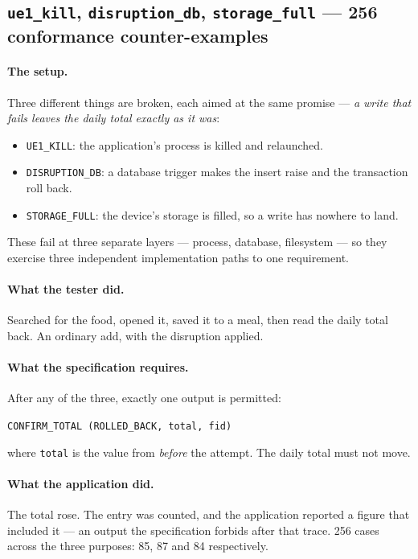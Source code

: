 \documentclass[11pt,a4paper]{article}
\newcommand{\gate}[1]{\texttt{\small #1}}
\begin{document}
\subsection{\gate{ue1\_kill}, \gate{disruption\_db}, \gate{storage\_full} --- 256 conformance counter-examples}
\label{sec:writepath}

\paragraph{The setup.}
Three different things are broken, each aimed at the same promise --- \emph{a
write that fails leaves the daily total exactly as it was}:

\begin{itemize}\setlength\itemsep{1pt}
  \item \gate{UE1\_KILL}: the application's process is killed and relaunched.
  \item \gate{DISRUPTION\_DB}: a database trigger makes the insert raise and the
        transaction roll back.
  \item \gate{STORAGE\_FULL}: the device's storage is filled, so a write has
        nowhere to land.
\end{itemize}

\noindent These fail at three separate layers --- process, database, filesystem
--- so they exercise three independent implementation paths to one requirement.

\paragraph{What the tester did.}
Searched for the food, opened it, saved it to a meal, then read the daily total
back. An ordinary add, with the disruption applied.

\paragraph{What the specification requires.}
After any of the three, exactly one output is permitted:

\begin{center}
\gate{CONFIRM\_TOTAL (ROLLED\_BACK, total, fid)}
\end{center}

\noindent where \gate{total} is the value from \emph{before} the attempt. The
daily total must not move.

\paragraph{What the application did.}
The total rose. The entry was counted, and the application reported a figure that
included it --- an output the specification forbids after that trace. 256 cases
across the three purposes: 85, 87 and 84 respectively.
\end{document}

